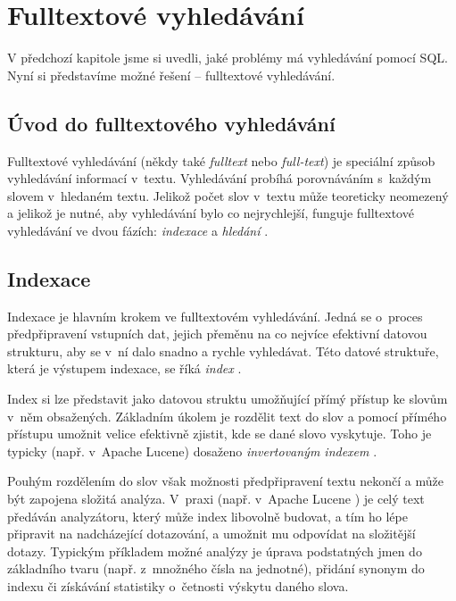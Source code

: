 \documentclass[11pt,oneside]{fithesis2}
\begin{document}
\section{Fulltextové vyhledávání}
V předchozí kapitole jsme si uvedli, jaké problémy má vyhledávání pomocí SQL. Nyní si představíme možné řešení -- fulltextové vyhledávání. 

\subsection{Úvod do fulltextového vyhledávání}
Fulltextové vyhledávání (někdy také \emph{fulltext} nebo \emph{full-text}) je speciální způsob vyhledávání informací v~textu. Vyhledávání probíhá porovnáváním s~každým slovem v~hledaném textu. Jelikož počet slov v~textu může teoreticky neomezený a jelikož je 
nutné, aby vyhledávání bylo co nejrychlejší, funguje fulltextové vyhledávání ve dvou fázích: \emph{indexace} a \emph{hledání} \cite[s.~11]{HibernateSearchAction}. 

\subsection{Indexace}
Indexace je hlavním krokem ve fulltextovém vyhledávání. Jedná se o~proces předpřipravení vstupních dat, jejich přeměnu na co nejvíce efektivní datovou strukturu, aby se v~ní dalo snadno a rychle vyhledávat. Této datové struktuře, která je výstupem indexace, se říká \emph{index} \cite[s.~11]{LuceneAction}. 

Index si lze představit jako datovou struktu umožňující přímý přístup ke slovům v~něm obsažených. Základním úkolem je rozdělit text do slov a pomocí přímého přístupu umožnit velice efektivně zjistit, kde se dané slovo vyskytuje. Toho je typicky (např. v~Apache Lucene) dosaženo \emph{invertovaným indexem} \cite[s.~35]{LuceneAction}. %

Pouhým rozdělením do slov však možnosti předpřipravení textu nekončí a může být zapojena složitá analýza. V~praxi (např. v~Apache Lucene \cite[s.~35]{LuceneAction}) je celý text předáván analyzátoru, který může index libovolně budovat, a tím ho lépe připravit na nadcházející dotazování, a umožnit mu odpovídat na složitější dotazy. Typickým příkladem možné analýzy je úprava podstatných jmen do základního tvaru (např. z~množného čísla na jednotné), přidání synonym do indexu či získávání statistiky o~četnosti výskytu daného slova.
\end{document}

